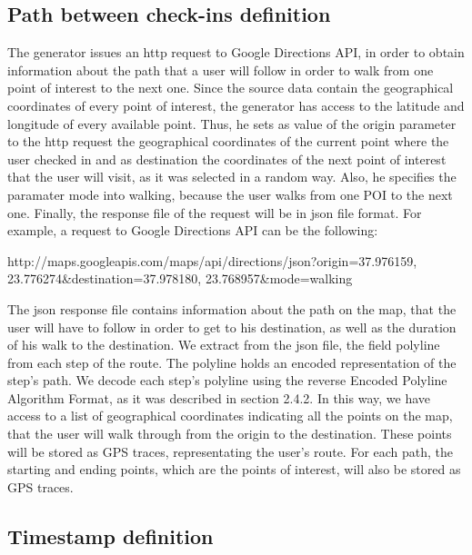 \subsection{Path between check-ins definition}

The generator issues an http request to Google Directions API, in order to obtain information about the path that a user will follow in order to walk from one point 
of interest to the next one. Since the source data contain the geographical coordinates of every point of interest, the generator has access to the latitude and 
longitude of every available point. Thus, he sets as value of the origin parameter to the http request the geographical coordinates of the current point where 
the user checked in and as destination the coordinates of the next point of interest that the user will visit, as it was selected in a random way. Also, he 
specifies the paramater mode into walking, because the user walks from one POI to the next one. Finally, the response file of the request will be in json file format. 
For example, a request to Google Directions API can be the following:
\begin{center}
 http://maps.googleapis.com/maps/api/directions/json?origin=37.976159, 23.776274\&destination=37.978180, 23.768957\&mode=walking
\end{center}

The json response file contains information about the path on the map, that the user will have to follow in order to get to his destination, as well as the duration of 
his walk to the destination. We extract from the json file, the field polyline from each step of the route. The polyline holds an encoded representation of the step's 
path. We decode each step's polyline using the reverse Encoded Polyline Algorithm Format, as it was described in section 2.4.2. In this way, we have access 
to a list of geographical coordinates indicating all the points on the map, that the user will walk through from the origin to the destination. These points 
will be stored as GPS traces, representating the user's route. For each path, the starting and ending points, which are the points of interest, will also be stored 
as GPS traces.

\subsection{Timestamp definition}

